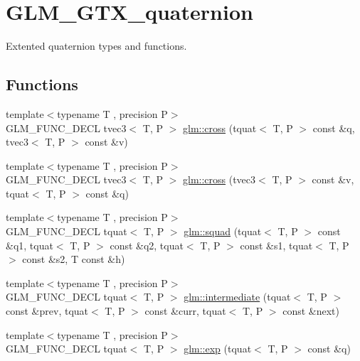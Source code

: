 \hypertarget{group__gtx__quaternion}{\section{G\-L\-M\-\_\-\-G\-T\-X\-\_\-quaternion}
\label{group__gtx__quaternion}
}


Extented quaternion types and functions.  


\subsection*{Functions}
\begin{DoxyCompactItemize}
\item 
{\footnotesize template$<$typename T , precision P$>$ }\\G\-L\-M\-\_\-\-F\-U\-N\-C\-\_\-\-D\-E\-C\-L tvec3$<$ T, P $>$ \hyperlink{group__gtx__quaternion_ga33ecf8ba903eee5fc09f0fbfc0d5ca6b}{glm\-::cross} (tquat$<$ T, P $>$ const \&q, tvec3$<$ T, P $>$ const \&v)
\item 
{\footnotesize template$<$typename T , precision P$>$ }\\G\-L\-M\-\_\-\-F\-U\-N\-C\-\_\-\-D\-E\-C\-L tvec3$<$ T, P $>$ \hyperlink{group__gtx__quaternion_ga4bfe3c7770fc43d14b8ef0058c4a86b5}{glm\-::cross} (tvec3$<$ T, P $>$ const \&v, tquat$<$ T, P $>$ const \&q)
\item 
{\footnotesize template$<$typename T , precision P$>$ }\\G\-L\-M\-\_\-\-F\-U\-N\-C\-\_\-\-D\-E\-C\-L tquat$<$ T, P $>$ \hyperlink{group__gtx__quaternion_gae75f537becdf2b1381b4482ec96e6c82}{glm\-::squad} (tquat$<$ T, P $>$ const \&q1, tquat$<$ T, P $>$ const \&q2, tquat$<$ T, P $>$ const \&s1, tquat$<$ T, P $>$ const \&s2, T const \&h)
\item 
{\footnotesize template$<$typename T , precision P$>$ }\\G\-L\-M\-\_\-\-F\-U\-N\-C\-\_\-\-D\-E\-C\-L tquat$<$ T, P $>$ \hyperlink{group__gtx__quaternion_ga56abae85b3669c866e91f3c57b298b9c}{glm\-::intermediate} (tquat$<$ T, P $>$ const \&prev, tquat$<$ T, P $>$ const \&curr, tquat$<$ T, P $>$ const \&next)
\item 
{\footnotesize template$<$typename T , precision P$>$ }\\G\-L\-M\-\_\-\-F\-U\-N\-C\-\_\-\-D\-E\-C\-L tquat$<$ T, P $>$ \hyperlink{group__gtx__quaternion_ga17295173d4c2b5ae49b84e9993b63a62}{glm\-::exp} (tquat$<$ T, P $>$ const \&q)
\item 

\end{DoxyCompactItemize}
